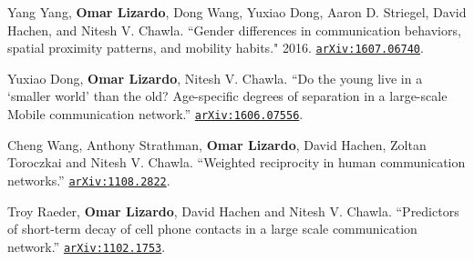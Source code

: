 \ind Yang Yang, {\bf Omar Lizardo}, Dong Wang, Yuxiao Dong, Aaron D. Striegel, David Hachen, and Nitesh V. Chawla. ``Gender differences in communication behaviors, spatial proximity patterns, and mobility habits." 2016. \href{https://arxiv.org/abs/1607.06740}{\nolinkurl{arXiv:1607.06740}}.

\ind Yuxiao Dong, {\bf Omar Lizardo}, Nitesh V. Chawla. ``Do the young live in a `smaller world' than the old? Age-specific degrees of separation in a large-scale Mobile communication network.'' \href{https://arxiv.org/abs/1606.07556}{\nolinkurl{arXiv:1606.07556}}.

\ind  Cheng Wang, Anthony Strathman, {\bf Omar Lizardo}, David Hachen, Zoltan Toroczkai and Nitesh V. Chawla. ``Weighted reciprocity in human communication networks.'' \href{https://arxiv.org/abs/1108.2822}{\nolinkurl{arXiv:1108.2822}}.

\ind Troy Raeder, {\bf Omar Lizardo}, David Hachen and Nitesh V. Chawla. ``Predictors of short-term decay of cell phone contacts in a large scale communication network.'' \href{https://arxiv.org/abs/1102.1753}{\nolinkurl{arXiv:1102.1753}}.
